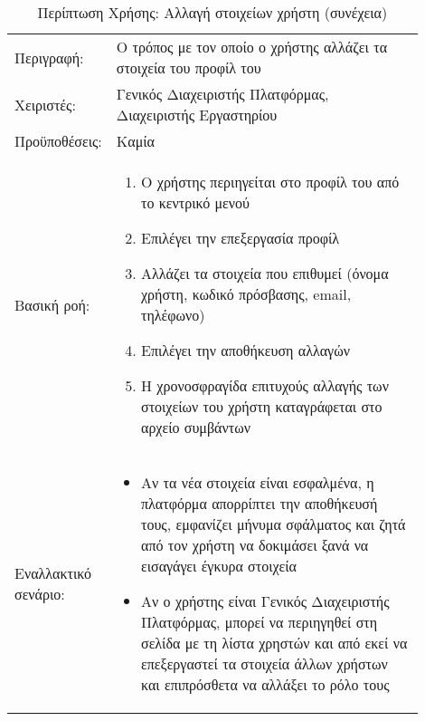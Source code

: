 %
%
\begin{longtable}{|p{0.14\linewidth}|p{0.76\linewidth}|}
	\caption{Περίπτωση Χρήσης: Αλλαγή στοιχείων χρήστη} \label{tab:use-case-change-profile} \\ \hline \endfirsthead
	\caption[{}]{Περίπτωση Χρήσης: Αλλαγή στοιχείων χρήστη (συνέχεια)} \\ \endhead \endfoot
	Περιγραφή: & Ο τρόπος με τον οποίο ο χρήστης αλλάζει τα στοιχεία του προφίλ του \\ \hline
	Χειριστές: & Γενικός Διαχειριστής Πλατφόρμας, Διαχειριστής Εργαστηρίου \\ \hline
	Προϋποθέσεις: & Καμία \\ \hline
	Βασική ροή: &
	\begin{enumerate}
		\vspace{-1cm}
		\addtolength{\itemindent}{-0.4cm}
		\item Ο χρήστης περιηγείται στο προφίλ του από το κεντρικό μενού
		\item Επιλέγει την επεξεργασία προφίλ
		\item Αλλάζει τα στοιχεία που επιθυμεί (όνομα χρήστη, κωδικό πρόσβασης, email, τηλέφωνο)
		\item Επιλέγει την αποθήκευση αλλαγών
		\item Η χρονοσφραγίδα επιτυχούς αλλαγής των στοιχείων του χρήστη καταγράφεται στο αρχείο συμβάντων
		\vspace{-0.7cm}
	\end{enumerate} \\ \hline
	Εναλλακτικό σενάριο: &
	\begin{itemize}
		\vspace{-1cm}
		\addtolength{\itemindent}{-0.4cm}
		\item Αν τα νέα στοιχεία είναι εσφαλμένα, η πλατφόρμα απορρίπτει την αποθήκευσή τους, εμφανίζει μήνυμα σφάλματος και ζητά από τον χρήστη να δοκιμάσει ξανά να εισαγάγει έγκυρα στοιχεία
		\item Αν ο χρήστης είναι Γενικός Διαχειριστής Πλατφόρμας, μπορεί να περιηγηθεί στη σελίδα με τη λίστα χρηστών και από εκεί να επεξεργαστεί τα στοιχεία άλλων χρήστων και επιπρόσθετα να αλλάξει το ρόλο τους
		\vspace{-0.7cm}
	\end{itemize} \\ \hline
\end{longtable}

